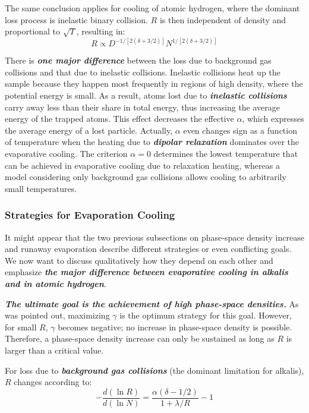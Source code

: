 \documentclass[12]{article}
\begin{document}
The same conclusion applies for cooling of atomic hydrogen, where the dominant loss process is inelastic binary collision. $R$ is then independent of density and proportional to $\sqrt{T}$, resulting in:$$R \propto D^{-1 /[2(\delta+3 / 2)]} N^{1 /[2(\delta+3 / 2)]}$$

There is \textbf{\textit{one major difference}} between the loss due to background gas collisions and that due to inelastic collisions. Inelastic collisions heat up the sample because they happen most frequently in regions of high density, where the potential energy is small. As a result, atoms lost due to \textbf{\textit{inelastic collisions}} carry away less than their share in total energy, thus increasing the average energy of the trapped atoms. This effect decreases the effective $\alpha$, which expresses the average energy of a lost particle. Actually, $\alpha$ even changes sign as a function of temperature when the heating due to \textbf{\textit{dipolar relaxation}} dominates over the evaporative cooling. The criterion $\alpha = 0$ determines the lowest temperature that can be achieved in evaporative cooling due to relaxation heating, whereas a model considering only background gas collisions allows cooling to arbitrarily small temperatures.
\subsubsection{Strategies for Evaporation Cooling}
It might appear that the two previous subsections on phase-space density increase and runaway evaporation describe different strategies or even conflicting goals. We now want to discuss qualitatively how they depend on each other and emphasize \textbf{\textit{the major difference between evaporative cooling in alkalis and in atomic hydrogen}}.

\textbf{\textit{The ultimate goal is the achievement of high phase-space densities.}} As was pointed out, maximizing $\gamma$ is the optimum strategy for this goal. However, for small $R$, $\gamma$ becomes negative; no increase in phase-space density is possible. Therefore, a phase-space density increase can only be sustained as long as $R$ is larger than a critical value. 

For loss due to \textbf{\textit{background gas collisions}} (the dominant limitation for alkalis), $R$ changes according to:$$
-\frac{d(\ln R)}{d(\ln N)}=\frac{\alpha(\delta-1 / 2)}{1+\lambda / R}-1$$ 
\end{document}
